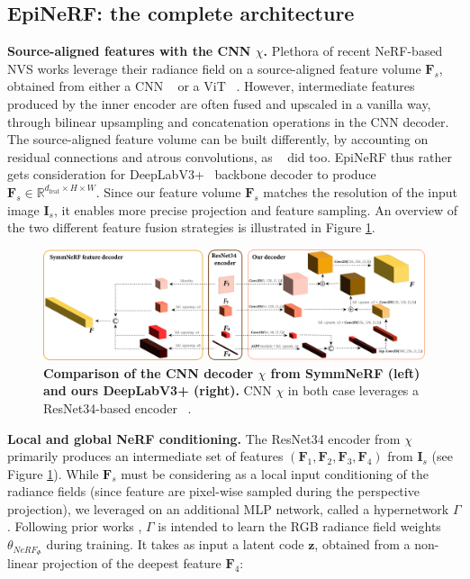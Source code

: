 \subsection{EpiNeRF: the complete architecture}
\label{subsec:epinerf}

\noindent\textbf{Source-aligned features with the CNN $\chi$.} Plethora of recent NeRF-based NVS works leverage their radiance field on a source-aligned feature volume $\mathbf{F}_{s}$, obtained from either a CNN ~\citep{jang2021codenerf,yu2021pixelnerf,li2022symmnerf} or a ViT ~\citep{lin2023vision}. However, intermediate features produced by the inner encoder are often fused and upscaled in a vanilla way, through bilinear upsampling and concatenation operations in the CNN decoder. 
The source-aligned feature volume can be built differently, by accounting on residual connections and atrous convolutions, as ~\citep{chan2023genvs} did too. 
EpiNeRF thus rather gets consideration for DeepLabV3+~\citep{chen2018encoder} backbone decoder to produce $\textbf{F}_{s}\in \mathbb{R}^{d_{\text{feat}} \times H \times W}$. Since our feature volume $\textbf{F}_{s}$ matches the resolution of the input image $\mathbf{I}_s$, it enables more precise projection and feature sampling. An overview of the two different feature fusion strategies is illustrated in Figure \ref{fig:feature_encoder}. 

\begin{figure}[h!]
  \begin{center}
  \includegraphics[width=\linewidth]{images/epinerf/feature_fusion_encoder.png}
  \end{center}
     \caption{\textbf{Comparison of the CNN decoder $\chi$ from SymmNeRF (left) and ours DeepLabV3+ (right).} CNN $\chi$ in both case leverages a ResNet34-based encoder ~\cite{he2016deep}. }
  \label{fig:feature_encoder}
  \end{figure}


\noindent\textbf{Local and global NeRF conditioning.} The ResNet34 encoder from $\chi$ primarily produces an intermediate set of features $(\mathbf{F}_{1},\mathbf{F}_{2},\mathbf{F}_{3},\mathbf{F}_{4})$ from $\textbf{I}_{s}$ (see Figure \ref{fig:feature_encoder}). While $\mathbf{F}_{s}$ must be considering as a local input conditioning of the radiance fields (since feature are pixel-wise sampled during the perspective projection), we leveraged on an additional MLP network, called a hypernetwork $\Gamma$. Following prior works \cite{sitzmann2019scene,li2022symmnerf}, $\Gamma$ is intended to learn the RGB radiance field weights $\theta_{NeRF_{\Phi}}$ during training. It takes as input a latent code $\mathbf{z}$, obtained from a non-linear projection of the deepest feature $\mathbf{F}_{4}$:

